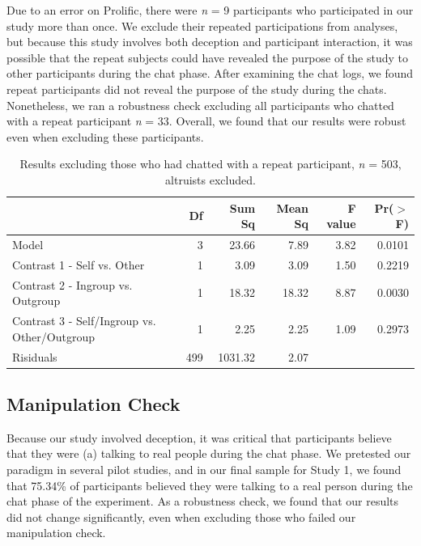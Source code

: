 \documentclass[12pt,]{article}
\begin{document}
Due to an error on Prolific, there were \emph{n} = 9 participants who participated in our study more than once. We exclude their repeated participations from analyses, but because this study involves both deception and participant interaction, it was possible that the repeat subjects could have revealed the purpose of the study to other participants during the chat phase. After examining the chat logs, we found repeat participants did not reveal the purpose of the study during the chats. Nonetheless, we ran a robustness check excluding all participants who chatted with a repeat participant \emph{n} = 33. Overall, we found that our results were robust even when excluding these participants.  

\begin{table}[ht]
\centering
\begin{tabular}{lrrrrr}
  \hline
 & Df & Sum Sq & Mean Sq & F value & Pr($>$F) \\ 
  \hline
Model & 3 & 23.66 & 7.89 & 3.82 & 0.0101 \\ 
  Contrast 1 - Self vs. Other & 1 & 3.09 & 3.09 & 1.50 & 0.2219 \\ 
  Contrast 2 - Ingroup vs. Outgroup & 1 & 18.32 & 18.32 & 8.87 & 0.0030 \\ 
  Contrast 3 - Self/Ingroup vs. Other/Outgroup & 1 & 2.25 & 2.25 & 1.09 & 0.2973 \\ 
  Risiduals & 499 & 1031.32 & 2.07 &  &  \\ 
   \hline
\end{tabular}
\caption{Results excluding those who had chatted with a repeat participant, \emph{n} = 503, altruists excluded. } 
\label{repeats_s1}
\end{table}


\newpage
\subsection{Manipulation Check}
\label{appendix:manip1}

Because our study involved deception, it was critical that participants believe that they were (a) talking to real people during the chat phase. We pretested our paradigm in several pilot studies, and in our final sample for Study 1, we found that  75.34\% of participants believed they were talking to a real person during the chat phase of the experiment. As a robustness check, we found that our results did not change significantly, even when excluding those who failed our manipulation check. 
\end{document}
